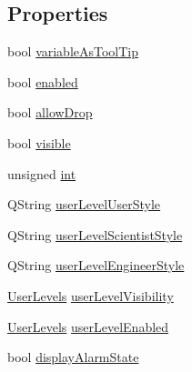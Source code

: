 \subsection*{Properties}
\begin{DoxyCompactItemize}
\item 
bool \hyperlink{classQEGroupBox_a98b187722b014911112842e2bf315720}{variableAsToolTip}
\item 
bool \hyperlink{classQEGroupBox_aa1baaa6c2cec673d24addade65acd2f3}{enabled}
\item 
bool \hyperlink{classQEGroupBox_a7a41419b7a252414abd344fbdf76f6d3}{allowDrop}
\item 
bool \hyperlink{classQEGroupBox_a05617d911ff363073f9b1f2c40e2db71}{visible}
\item 
unsigned \hyperlink{classQEGroupBox_a717ad8ca5b5dc1f44b118d31a2a5736d}{int}
\item 
QString \hyperlink{classQEGroupBox_a31519ee2f188352af49695b774c0794a}{userLevelUserStyle}
\item 
QString \hyperlink{classQEGroupBox_a5d1841110a7dd0733755640f5ebd0713}{userLevelScientistStyle}
\item 
QString \hyperlink{classQEGroupBox_a56cdaa9cf2d9e1682f7f249c9b949361}{userLevelEngineerStyle}
\item 
\hyperlink{classQEGroupBox_ad5a2c847226aa067c44f86ed42ddaba8}{UserLevels} \hyperlink{classQEGroupBox_af592de1c93b6a919b9431c0dc3868dcc}{userLevelVisibility}
\item 
\hyperlink{classQEGroupBox_ad5a2c847226aa067c44f86ed42ddaba8}{UserLevels} \hyperlink{classQEGroupBox_ad26f2a98dccecbdfbe200e3f032262fb}{userLevelEnabled}
\item 
bool \hyperlink{classQEGroupBox_ad429fc7e8a9f1dfc0fd3c66f8b7801d8}{displayAlarmState}
\end{DoxyCompactItemize}


